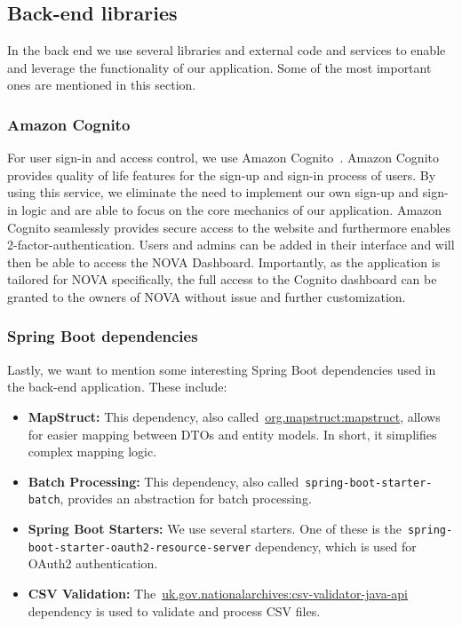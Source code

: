 \subsection{Back-end libraries}\label{subsec:back-end-libraries}

In the back end we use several libraries and external code and services to enable and leverage the functionality of our
application.
Some of the most important ones are mentioned in this section.

\subsubsection{Amazon Cognito}

For user sign-in and access control, we use Amazon Cognito~\cite{cognito2024}.
Amazon Cognito provides quality of life features for the sign-up and sign-in process of users.
By using this service, we eliminate the need to implement our own sign-up and sign-in logic and are able to focus on the
core mechanics of our application.
Amazon Cognito seamlessly provides secure access to the website and furthermore enables 2-factor-authentication.
Users and admins can be added in their interface and will then be able to access the NOVA Dashboard.
Importantly, as the application is tailored for NOVA specifically, the full access to the Cognito dashboard can be
granted to the owners of NOVA without issue and further customization.

\subsubsection{Spring Boot dependencies}

Lastly, we want to mention some interesting Spring Boot dependencies used in the back-end application.
These include:

\begin{itemize}
    \item \textbf{MapStruct:}
    This dependency, also called~\url{org.mapstruct:mapstruct}, allows for easier mapping between DTOs and
    entity models.
    In short, it simplifies complex mapping logic.

    \item \textbf{Batch Processing:}
    This dependency, also called~\texttt{spring-boot-starter-batch}, provides an abstraction for batch processing.

    \item \textbf{Spring Boot Starters:}
    We use several starters.
    One of these is the~\texttt{spring-boot-starter-oauth2-resource-server} dependency, which is used for
    OAuth2 authentication.

    \item \textbf{CSV Validation:}
    The~\url{uk.gov.nationalarchives:csv-validator-java-api} dependency is used to validate and process CSV
    files.
\end{itemize}
